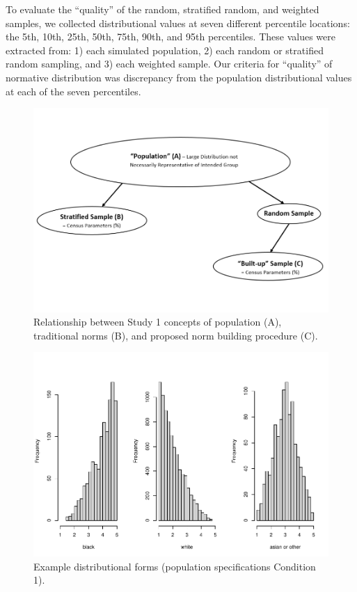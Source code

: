 \documentclass[
  ,man]{apa7}
\begin{document}
To evaluate the ``quality'' of the random, stratified random, and weighted samples, we collected distributional values at seven different percentile locations: the 5th, 10th, 25th, 50th, 75th, 90th, and 95th percentiles. These values were extracted from: 1) each simulated population, 2) each random or stratified random sampling, and 3) each weighted sample. Our criteria for ``quality'' of normative distribution was discrepancy from the population distributional values at each of the seven percentiles.

\begin{figure}
\centering
\includegraphics{NormsBuilding_files/figure-latex/Figure1-1.pdf}
\caption{\label{fig:Figure1}Relationship between Study 1 concepts of population (A), traditional norms (B), and proposed norm building procedure (C).}
\end{figure}

\begin{figure}
\centering
\includegraphics{NormsBuilding_files/figure-latex/Figure2-1.pdf}
\caption{\label{fig:Figure2}Example distributional forms (population specifications Condition 1).}
\end{figure}
\end{document}
